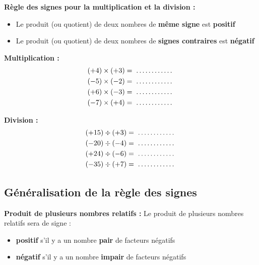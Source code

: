 \begin{proprietebox}
\textbf{Règle des signes pour la multiplication et la division :}
\begin{itemize}[label = \textbullet]
\item Le produit (ou quotient) de deux nombres de \textbf{même signe} est \textbf{positif}
\item Le produit (ou quotient) de deux nombres de \textbf{signes contraires} est \textbf{négatif}
\end{itemize}
\end{proprietebox}

\begin{examplebox}
\begin{minipage}[t]{0.48\textwidth}
\textbf{Multiplication :}
\begin{align*}
(+4) \times (+3) &= \trous{2cm} \\
(-5) \times (-2) &= \trous{2cm} \\
(+6) \times (-3) &= \trous{2cm} \\
(-7) \times (+4) &= \trous{2cm}
\end{align*}
\end{minipage}
\hfill
\begin{minipage}[t]{0.48\textwidth}
\textbf{Division :}
\begin{align*}
(+15) \div (+3) &= \trous{2cm} \\
(-20) \div (-4) &= \trous{2cm} \\
(+24) \div (-6) &= \trous{2cm} \\
(-35) \div (+7) &= \trous{2cm}
\end{align*}
\end{minipage}
\end{examplebox}

\subsection{Généralisation de la règle des signes}
\begin{proprietebox}
\textbf{Produit de plusieurs nombres relatifs :}
Le produit de plusieurs nombres relatifs sera de signe :
\begin{itemize}[label = \textbullet]
\item \textbf{positif} s'il y a un nombre \textbf{pair} de facteurs négatifs
\item \textbf{négatif} s'il y a un nombre \textbf{impair} de facteurs négatifs
\end{itemize}
\end{proprietebox}


